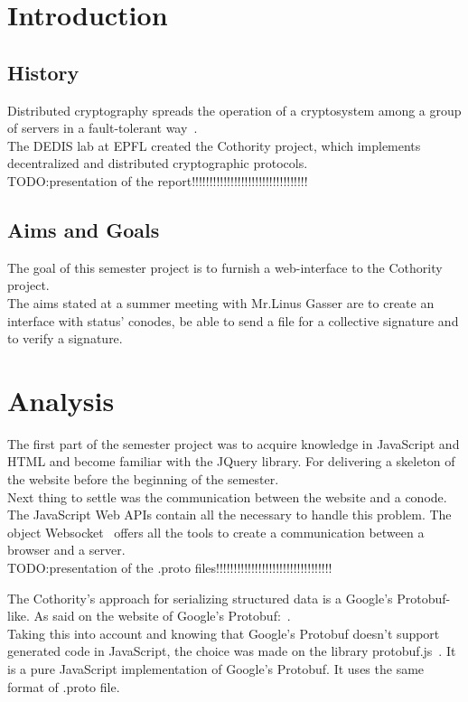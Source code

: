\documentclass[11pt, a4paper, twoside, openright]{book} %
\begin{document}


\begingroup
\let\cleardoublepage\clearpage
\tableofcontents
\endgroup

\chapter{Introduction}
\section{History}
Distributed cryptography spreads the operation of a cryptosystem among a group
of servers in a fault-tolerant way~\cite{definition}.\\
The DEDIS lab at EPFL created the Cothority project, which implements decentralized
and distributed cryptographic protocols.\\

TODO:presentation of the report!!!!!!!!!!!!!!!!!!!!!!!!!!!!!!!!!

\section{Aims and Goals}
The goal of this semester project is to furnish a web-interface to the Cothority
project.\\
The aims stated at a summer meeting with Mr.Linus Gasser are to create an
interface with status' conodes, be able to send a file for a collective signature
and to verify a signature.\\


\chapter{Analysis}
The first part of the semester project was to acquire knowledge in JavaScript and
HTML and become familiar with the JQuery library. For delivering a skeleton of
the website before the beginning of the semester.\\
Next thing to settle was the communication between the website and a conode.
The JavaScript Web APIs contain all the necessary to handle this problem.
The object Websocket~\cite{websocketPage} offers all the tools to create a
communication between a browser and a server.\\

TODO:presentation of the .proto files!!!!!!!!!!!!!!!!!!!!!!!!!!!!!!!!!


The Cothority's approach for serializing structured data is a Google's Protobuf-like.
As said on the website of Google's Protobuf:~\cite{protobufDefi}.\\
Taking this into account and knowing that Google's Protobuf doesn't support generated
code in JavaScript, the choice was made on the library protobuf.js~\cite{protobufjs}.
It is a pure JavaScript implementation of Google's Protobuf. It uses the same format
of .proto file.
\end{document}
